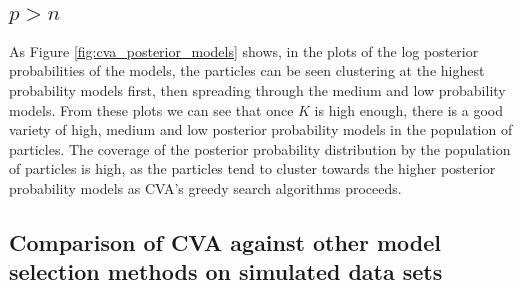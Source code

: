 \subsection{$p > n$}



As Figure \ref{fig:cva_posterior_models} shows, 
in the plots of the log posterior probabilities of the models, the particles can be seen clustering at the
highest probability models first, then spreading through the medium and low probability models. From these
plots we can see that once $K$ is high enough, there is a good variety of high, medium and low posterior
probability models in the population of particles. The coverage of the posterior probability distribution
by the population of particles is high, as the particles tend to cluster towards the higher posterior
probability models as CVA's greedy search algorithms proceeds.

\subsection{Comparison of CVA against other model selection methods on simulated data sets}

	
